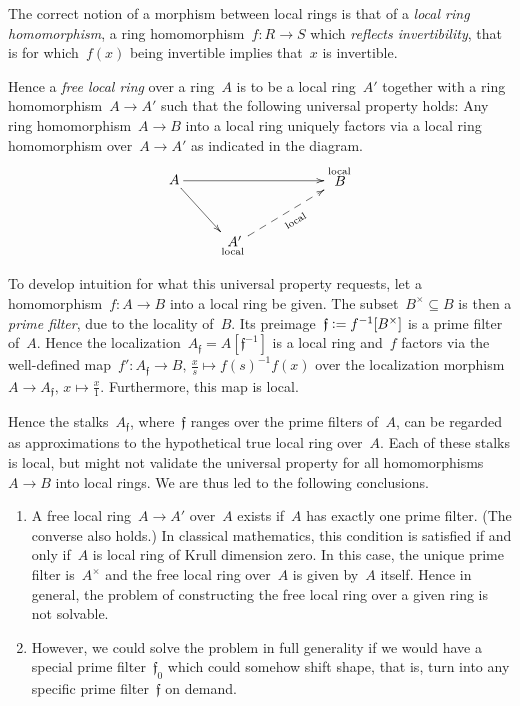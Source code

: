 \documentclass{ws-rv9x6}
\newcommand{\fff}{\mathfrak{f}}
\newcommand{\defeq}{\vcentcolon=}
\renewcommand{\_}{\mathpunct{.}}
\newcommand{\?}{\,{:}\,}
\begin{document}
The correct notion of a morphism between local rings is that of a \emph{local
ring homomorphism}, a ring homomorphism~$f : R \to S$ which \emph{reflects
invertibility}, that is for which~$f(x)$ being invertible implies that~$x$ is
invertible.

Hence a \emph{free local ring} over a ring~$A$ is to be a local ring~$A'$
together with a ring homomorphism~$A \to A'$ such that the following universal
property holds: Any ring homomorphism~$A \to B$ into a local ring uniquely
factors via a local ring homomorphism over~$A \to A'$ as indicated in the diagram.
\[ \xymatrix{
  A \ar[rd] \ar[rrr] &&& {\substack{\text{local}\\\text{\normalsize$\!\!\!B$}\\\phantom{\text{local}}}} \\
  & {\substack{\text{\normalsize$\!\!A'$}\\\text{local}}} \ar@{-->}_[@!31]{\text{local}}[rru]
} \]

To develop intuition for what this universal property requests, let a
homomorphism~$f : A \to B$ into a local ring be given. The subset~$B^\times
\subseteq B$ is then a \emph{prime filter}, due to the locality of~$B$. Its
preimage~$\fff \defeq f^{-1}[B^\times]$ is a prime filter of~$A$. Hence the
localization~$A_\fff = A[\fff^{-1}]$ is a local ring and~$f$ factors via the
well-defined map~$f' : A_\fff \to B,\,\frac{x}{s} \mapsto f(s)^{-1}f(x)$ over
the localization morphism~$A \to A_\fff,\,x \mapsto \frac{x}{1}$. Furthermore,
this map is local.

Hence the stalks~$A_\fff$, where~$\fff$ ranges over the prime filters of~$A$,
can be regarded as approximations to the hypothetical true local ring over~$A$.
Each of these stalks is local, but might not validate the universal property
for all homomorphisms~$A \to B$ into local rings. We are thus led to the
following conclusions.

\begin{enumerate}
\item A free local ring~$A \to A'$ over~$A$ exists if~$A$ has exactly one prime
filter. (The converse also holds.) In classical mathematics, this condition is
satisfied if and only if~$A$ is local ring of Krull dimension zero. In this
case, the unique prime filter is~$A^\times$ and the free local ring over~$A$ is given
by~$A$ itself. Hence in general, the problem of constructing the free local
ring over a given ring is not solvable.
\item However, we could solve the problem in full generality if we would have a
special prime filter~$\fff_0$ which could somehow shift shape, that is, turn into any
specific prime filter~$\fff$ on demand.
\end{enumerate}
\end{document}
